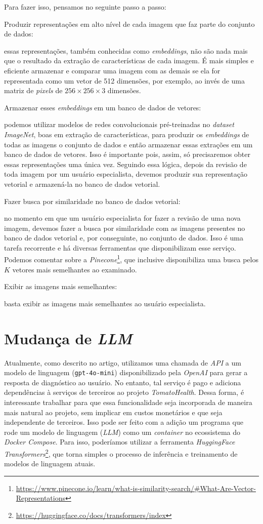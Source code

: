 Para fazer isso, pensamos no seguinte passo a passo:
\begin{enumerate}
    {\bf  \item Produzir representações em alto nível de cada imagem que faz parte do conjunto de dados:} essas representações, também conhecidas como \emph{embeddings}, não são nada mais que o resultado da extração de características de cada imagem. É mais simples e eficiente armazenar e comparar uma imagem com as demais se ela for representada como um vetor de 512 dimensões, por exemplo, ao invés de uma matriz de \emph{pixels} de $256 \times 256 \times 3$ dimensões.
    {\bf \item Armazenar esses \emph{embeddings} em um banco de dados de vetores:} podemos utilizar modelos de redes convolucionais pré-treinadas no \emph{dataset ImageNet}, boas em extração de características, para produzir os \emph{embeddings} de todas as imagens o conjunto de dados e então armazenar essas extrações em um banco de dados de vetores. Isso é importante pois, assim, só precisaremos obter essas representações uma única vez. Seguindo essa lógica, depois da revisão de toda imagem por um usuário especialista, devemos produzir sua representação vetorial e armazená-la no banco de dados vetorial.
    {\bf \item Fazer busca por similaridade no banco de dados vetorial:} no momento em que um usuário especialista for fazer a revisão de uma nova imagem, devemos fazer a busca por similaridade com as imagens presentes no banco de dados vetorial e, por conseguinte, no conjunto de dados. Isso é uma tarefa recorrente e há diversas ferramentas que disponibilizam esse serviço. Podemos comentar sobre a \emph{Pinecone}\footnote{\url{https://www.pinecone.io/learn/what-is-similarity-search/\#What-Are-Vector-Representations}}, que inclusive disponibiliza uma busca pelos $K$ vetores mais semelhantes ao examinado.
     {\bf \item Exibir as imagens mais semelhantes:} basta exibir as imagens mais semelhantes ao usuário especialista.
\end{enumerate}

\section{Mudança de \emph{LLM}}

Atualmente, como descrito no artigo, utilizamos uma chamada de \textit{API} a um modelo de linguagem (\texttt{gpt-4o-mini}) disponibilizado pela \textit{OpenAI} para gerar a resposta de diagnóstico ao usuário. No entanto, tal serviço é pago e adiciona dependências à serviços de terceiros ao projeto \emph{TomatoHealth}. Dessa forma, é interessante trabalhar para que essa funcionalidade seja incorporada de maneira mais natural ao projeto, sem implicar em custos monetários e que seja independente de terceiros. Isso pode ser feito com a adição um programa que rode um modelo de linguagem (\emph{LLM}) como um \emph{container} no ecossistema do \emph{Docker Compose}. Para isso, poderíamos utilizar a ferramenta \emph{HuggingFace Transformers}\footnote{\url{https://huggingface.co/docs/transformers/index}}, que torna simples o processo de inferência e treinamento de modelos de linguagem atuais.
